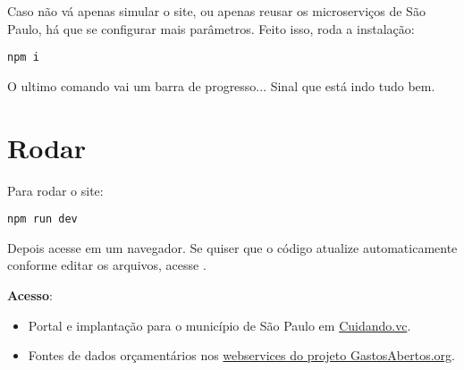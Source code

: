 \documentclass[letterpaper,10pt,english]{sphinxmanual}
\begin{document}
Caso não vá apenas simular o site, ou apenas reusar os microserviços de
São Paulo, há que se configurar mais parâmetros. Feito isso, roda a
instalação:

\begin{Verbatim}[commandchars=\\\{\}]
npm i
\end{Verbatim}

O ultimo comando vai um barra de progresso... Sinal que está indo tudo
bem.


\chapter{Rodar}
\label{install-site:rodar}
Para rodar o site:

\begin{Verbatim}[commandchars=\\\{\}]
npm run dev
\end{Verbatim}

Depois acesse  em um navegador. Se quiser que o código
atualize automaticamente conforme editar os arquivos, acesse
.

\textbf{Acesso}:
\begin{itemize}
\item {} 
Portal e implantação para o município de São Paulo em  \href{http://cuidando.vc}{Cuidando.vc}.

\item {} 
Fontes de dados orçamentários nos \href{http://demo.gastosabertos.org}{webservices do projeto GastosAbertos.org}.

\end{itemize}
\end{document}
